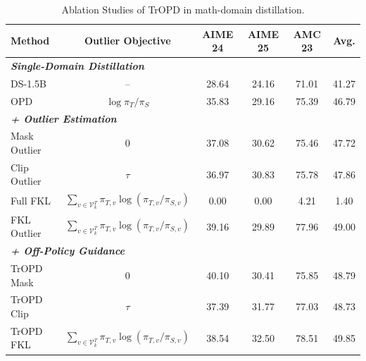 \documentclass{llmxive}
\providecommand{\arraystretch}{1.12}
\begin{document}
\begin{table}[t]
\centering
\small
\setlength{\tabcolsep}{6pt}
\renewcommand{\arraystretch}{1.1}
\begin{tabular}{lccccc}
\toprule
Method & Outlier Objective & AIME 24 & AIME 25 & AMC 23 & Avg. \\
\midrule
\multicolumn{3}{l}{\emph{\quad \textbf{Single-Domain Distillation}}} \\
DS-1.5B            & -- & 28.64 & 24.16 & 71.01 & 41.27 \\
OPD                & $\log \pi_{T}/\pi_{S}$
                   & 35.83 & 29.16 & 75.39 & 46.79 \\
\midrule
\multicolumn{3}{l}{\emph{\quad \textbf{+ Outlier Estimation}}} \\ 
Mask Outlier       & 0  & 37.08 & 30.62 & 75.46 & 47.72 \\
Clip Outlier       & $\tau$ & 36.97 & 30.83 & 75.78 & 47.86 \\
Full FKL           & $\sum_{v \in \mathcal{V}^{T}_{k}} \pi_{T,v} \log (\pi_{T,v}/\pi_{S,v})$ 
                   & 0.00  & 0.00  & 4.21  & 1.40  \\
\rowcolor{lightpurple} FKL Outlier 
                   & $\sum_{v \in \mathcal{V}^{T}_{k}} \pi_{T,v} \log (\pi_{T,v}/\pi_{S,v})$ 
                   & 39.16 & 29.89 & 77.96 & 49.00 \\
\midrule
\multicolumn{3}{l}{\emph{\quad \textbf{+ Off-Policy Guidance}}} \\ 
TrOPD Mask         & 0 & 40.10 & 30.41 & 75.85 & 48.79 \\
TrOPD Clip         & $\tau$ & 37.39 & 31.77 & 77.03 & 48.73 \\
\rowcolor{lightpurple} TrOPD FKL 
                   & $\sum_{v \in \mathcal{V}^{T}_{k}} \pi_{T,v} \log (\pi_{T,v}/\pi_{S,v})$ 
                   & 38.54 & 32.50 & 78.51 & 49.85 \\
\bottomrule
\end{tabular}%
\caption{Ablation Studies of TrOPD in math-domain distillation.}
\vskip -0.1in 
\label{tab:ablation}
\end{table}
\end{document}

